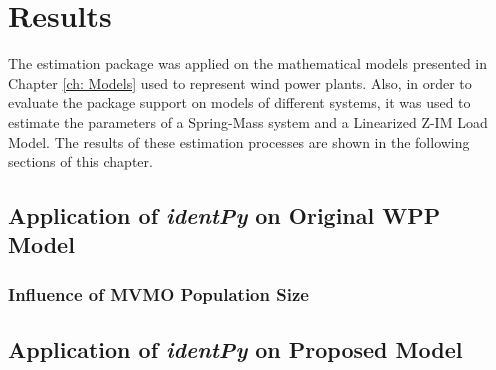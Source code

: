 \chapter{Results}
\label{ch: Results}

The estimation package was applied on the mathematical models presented in Chapter \ref{ch: Models} used to represent wind power plants. Also, in order to evaluate the package support on models of different systems, it was used to estimate the parameters of a Spring-Mass system and a Linearized Z-IM Load Model. The results of these estimation processes are shown in the following sections of this chapter.

\section{Application of \textit{identPy} on Original WPP Model}



\subsection{Influence of MVMO Population Size}



\section{Application of \textit{identPy} on Proposed Model}
